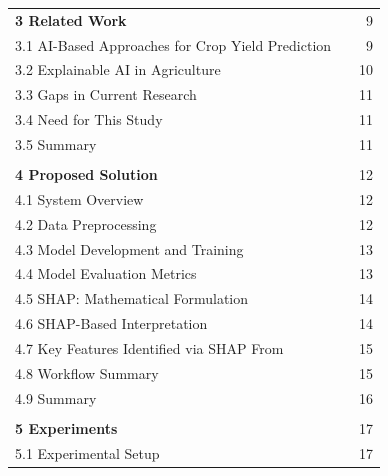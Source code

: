 \documentclass[a4paper,11pt,oneside]{book}
\begin{document}
\newpage  %

\begin{flushleft}
\begin{tabularx}{\textwidth}{@{}lXr@{}}
\textbf{3 Related Work} & & 9 \\
\hspace{1em}3.1 AI-Based Approaches for Crop Yield Prediction & & 9 \\
\hspace{1em}3.2 Explainable AI in Agriculture & & 10 \\
\hspace{1em}3.3 Gaps in Current Research & & 11 \\
\hspace{1em}3.4 Need for This Study & & 11 \\
\hspace{1em}3.5 Summary & & 11 \\
\\
\textbf{4 Proposed Solution} & & 12 \\
\hspace{1em}4.1 System Overview & & 12 \\
\hspace{1em}4.2 Data Preprocessing & & 12 \\
\hspace{1em}4.3 Model Development and Training & & 13 \\
\hspace{1em}4.4 Model Evaluation Metrics & & 13 \\
\hspace{1em}4.5 SHAP: Mathematical Formulation & & 14 \\
\hspace{1em}4.6 SHAP-Based Interpretation & & 14 \\
\hspace{1em}4.7 Key Features Identified via SHAP From & & 15 \\
\hspace{1em}4.8 Workflow Summary & & 15 \\
\hspace{1em}4.9 Summary & & 16 \\
\\
\textbf{5 Experiments} & & 17 \\
\hspace{1em}5.1 Experimental Setup & & 17 \\

\end{tabularx}
\end{flushleft}
\end{document}
